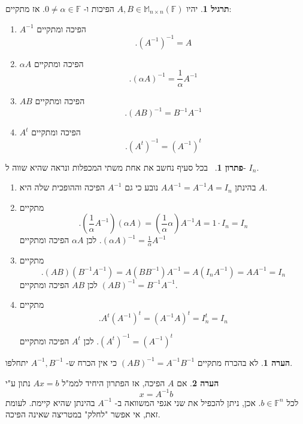 \documentclass[12pt]{report}
\theoremstyle{plain}
\theoremstyle{definition}
\newtheorem{exercise}{תרגיל}[chapter]
\newtheorem{remark}{הערה}[chapter]
\newtheorem*{solution}{פתרון}
\newcommand{\F}{\mathbb{F}}
\newcommand{\M}{\mathbb{M}}
\newcommand{\0}{\mathbf{0}}
\begin{document}
\begin{exercise}\label{exer:inverse-product}
יהיו
$A,B\in\M_{n\times n}(\F)$
הפיכות ו-
$0\neq \alpha\in\F$.
אז מתקיים:
\begin{enumerate}[label=\alph*.]
\item 
$A^{-1}$
הפיכה ומתקיים
$$
.(A^{-1})^{-1}=A
$$

\item
$\alpha A$
הפיכה ומתקיים
$$
.(\alpha A)^{-1}=\frac{1}{\alpha}A^{-1}
$$


\item
$AB$
הפיכה ומתקיים
$$
.(AB)^{-1}=B^{-1}A^{-1}
$$


\item 
$A^t$
הפיכה ומתקיים
$$
.(A^t)^{-1}=(A^{-1})^t
$$


\end{enumerate}
\end{exercise}

\begin{solution}\
בכל סעיף נחשב את אחת משתי המכפלות ונראה שהיא שווה ל-
$I_n$.
\begin{enumerate}[label=\alph*.]
\item 
בהינתן
$AA^{-1}=A^{-1}A=I_n$
נובע כי גם
$A^{-1}$
הפיכה וההופכית שלה היא
$A$.

\item
מתקיים
$$
.(\frac{1}{\alpha}A^{-1})(\alpha A)=(\frac{1}{\alpha}\alpha)A^{-1}A=1\cdot I_n=I_n
$$
לכן
$\alpha A$
הפיכה ומתקיים
$
.(\alpha A)^{-1}=\frac{1}{\alpha}A^{-1}
$


\item
מתקיים
$$
.(AB)(B^{-1}A^{-1})=A(BB^{-1})A^{-1}=A(I_nA^{-1})=AA^{-1}=I_n
$$
לכן
$AB$
הפיכה ומתקיים
$
(AB)^{-1}=B^{-1}A^{-1}
$.


\item
מתקיים
$$
.A^t(A^{-1})^t=(A^{-1}A)^t=I_n^t=I_n
$$

לכן 
$A^t$
הפיכה ומתקיים
$
.(A^t)^{-1}=(A^{-1})^t
$


\end{enumerate}
\end{solution}

\begin{remark}
לא בהכרח מתקיים
$
(AB)^{-1}=A^{-1}B^{-1}
$
כי אין הכרח ש-
$A^{-1},B^{-1}$
יתחלפו.
\end{remark}

\begin{remark}
אם
$A$
הפיכה, אז הפתרון היחיד לממ"ל
$Ax=b$
נתון ע"י
$$x=A^{-1}b$$
לכל
$b\in\F^n$.
אכן, ניתן להכפיל את שני אגפי המשוואה ב-
$A^{-1}$
בהינתן שהיא קיימת. לעומת זאת, אי אפשר "לחלק" במטריצה שאינה הפיכה.
\end{remark}
\end{document}

